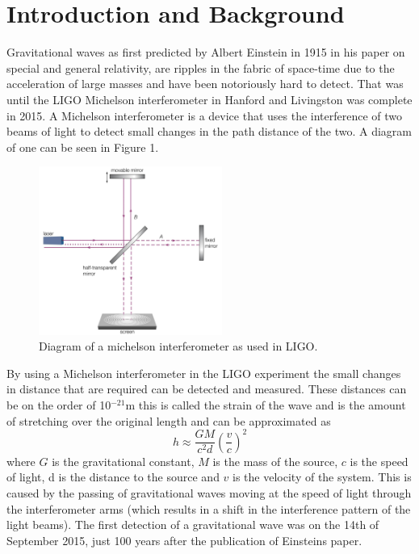 \documentclass{article}
\begin{document}
\section*{Introduction and Background}
Gravitational waves as first predicted by Albert Einstein in 1915 in his paper on
special and general relativity, are ripples in the fabric of space-time due to the acceleration of large masses
and have been notoriously hard to detect. That was until
the LIGO Michelson interferometer in Hanford and Livingston was complete in 2015.
A Michelson interferometer is a device that uses the interference of two beams of
light to detect small changes in the path distance of the two. A diagram of one can
be seen in Figure 1.
\begin{figure}[h]
    \includegraphics[width=6cm]{images/michelson_interferometer.png}
    \caption{Diagram of a michelson interferometer as used in LIGO.\cite{AZO}}\label{michelson}
\end{figure}
\newline
By using a Michelson interferometer in the LIGO experiment the small changes in
distance that are required can be detected and measured. These distances can be on the
order of 10$^{-21}$m this is called the strain of the wave and
is the amount of stretching over the original length and can be approximated as
\begin{equation}h
    \approx \frac{GM}{c^2d}\left(\frac{v}{c}\right)^2 \label{eq:strain}
\end{equation}
where $G$ is the gravitational constant, $M$ is the mass of the source, $c$ is the speed of light,
d is the distance to the source and $v$ is the velocity of the system.
\newline
This is caused by the passing of gravitational waves moving at the speed of light
through the
interferometer arms (which results in a shift in the interference pattern of the light beams).
The first detection of a gravitational wave was on the 14th of
September 2015, just 100 years after the publication of Einsteins paper.
\end{document}
